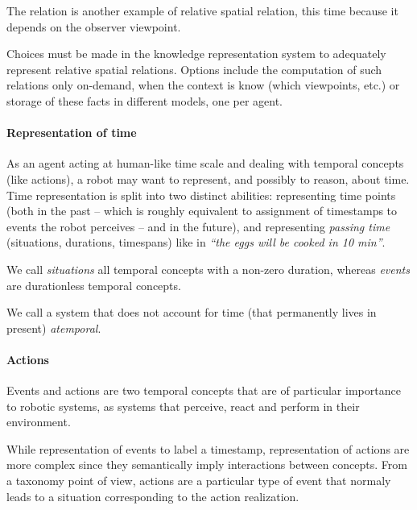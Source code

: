 The relation  is another example of relative spatial relation,
this time because it depends on the observer viewpoint.


Choices must be made in the knowledge representation system to adequately
represent relative spatial relations. Options include the computation of such
relations only on-demand, when the context is know (which viewpoints, etc.) or
storage of these facts in different models, one per agent.


\paragraph{Representation of time}

As an agent acting at human-like time scale and dealing with temporal concepts
(like actions), a robot may want to represent, and possibly to reason, about
time. Time representation is split into two distinct abilities: representing
time points (both in the past -- which is roughly equivalent to assignment of
timestamps to events the robot perceives -- and in the future), and
representing \emph{passing time} (situations, durations, timespans) like in
\emph{``the eggs will be cooked in 10 min''}.

We call \emph{situations} all temporal concepts with a non-zero duration,
whereas \emph{events} are durationless temporal concepts.


We call a system that does not account for time (\ie that permanently lives in
present) \emph{atemporal}.


\paragraph{Actions}

Events and actions are two temporal concepts that are of particular importance to
robotic systems, as systems that perceive, react and perform in their environment.

While representation of events  to label a timestamp,
representation of actions are more complex since they semantically imply
interactions between concepts. From a taxonomy point of view, actions are a
particular type of event that normaly leads to a situation corresponding to the
action realization.

